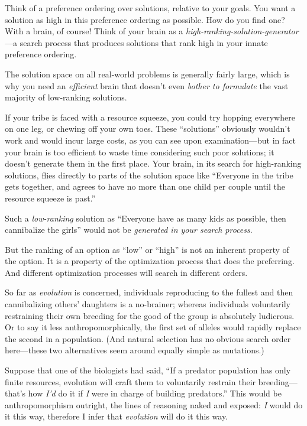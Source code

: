 { Think of a preference ordering over solutions, relative to your
goals. You want a solution as high in this preference ordering as
possible. How do you find one? With a brain, of course! Think of your
brain as a \textit{high-ranking-solution-generator}{}---a search
process that produces solutions that rank high in your innate
preference ordering.


 The solution space on all real-world problems is generally fairly
large, which is why you need an \textit{efficient} brain that
doesn't even \textit{bother to formulate} the vast
majority of low-ranking solutions.


 If your tribe is faced with a resource squeeze, you could try
hopping everywhere on one leg, or chewing off your own toes. These
``solutions'' obviously
wouldn't work and would incur large costs, as you can
see upon examination---but in fact your brain is too efficient to waste
time considering such poor solutions; it doesn't
generate them in the first place. Your brain, in its search for
high-ranking solutions, flies directly to parts of the solution space
like ``Everyone in the tribe gets together, and agrees
to have no more than one child per couple until the resource squeeze is
past.''


 Such a \textit{low-ranking} solution as
``Everyone have as many kids as possible, then
cannibalize the girls'' would not be
\textit{generated in your search process}.


 But the ranking of an option as
``low'' or
``high'' is not an inherent property
of the option. It is a property of the optimization process that does
the preferring. And different optimization processes will search in
different orders.


 So far as \textit{evolution} is concerned, individuals reproducing
to the fullest and then cannibalizing others' daughters
is a no-brainer; whereas individuals voluntarily restraining their own
breeding for the good of the group is absolutely ludicrous. Or to say
it less anthropomorphically, the first set of alleles would rapidly
replace the second in a population. (And natural selection has no
obvious search order here---these two alternatives seem around equally
simple as mutations.)


 Suppose that one of the biologists had said, ``If
a predator population has only finite resources, evolution will craft
them to voluntarily restrain their breeding---that's
how \textit{I'd} do it if \textit{I} were in charge of
building predators.'' This would be anthropomorphism
outright, the lines of reasoning naked and exposed: \textit{I} would do
it this way, therefore I infer that \textit{evolution} will do it this
way.


}
